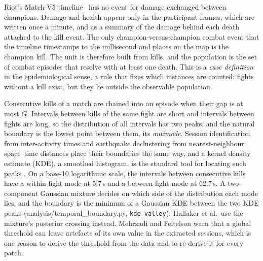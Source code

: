 Riot's Match-V5 timeline~\cite{riotapi2024timeline} has no event for damage exchanged between champions.
Damage and health appear only in the participant frames, which are written once a minute, and as a
summary of the damage behind each death attached to the kill event. The only champion-versus-champion
combat event that the timeline timestamps to the millisecond and places on the map is the champion
kill.
The unit is therefore built from kills, and the population is the set of combat episodes that resolve
with at least one death. This is a \emph{case definition} in the epidemiological sense, a rule that
fixes which instances are counted: fights without a kill exist, but they lie outside the observable
population.

Consecutive kills of a match are chained into an episode when their gap is at most $G$. Intervals
between kills of the same fight are short and intervals between fights are long, so the distribution of
all intervals has two peaks, and the natural boundary is the lowest point between them, its
\emph{antimode}. Session identification from inter-activity times \cite{halfaker2015session,mehrzadi2012session}
and earthquake declustering from nearest-neighbour space--time distances \cite{zaliapin2013clusters}
place their boundaries the same way, and a kernel density estimate (KDE), a smoothed histogram, is the
standard tool for locating such peaks \cite{silverman1981multimodality}. On a base-10 logarithmic scale,
the intervals between consecutive kills have a within-fight mode at 5.7\,s and a between-fight mode at
62.7\,s.
A two-component Gaussian mixture decides on which side of the distribution each mode lies, and the
boundary is the minimum of a Gaussian KDE between the two KDE peaks (analysis/temporal\_boundary.py,
\texttt{kde\_valley}). Halfaker et al.\ use the mixture's posterior crossing instead. Mehrzadi and
Feitelson warn that a global threshold can leave artefacts of its own value in the extracted sessions,
which is one reason to derive the threshold from the data and to re-derive it for every patch.

